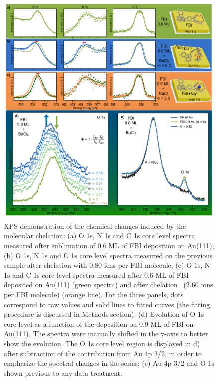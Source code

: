 \documentclass[aps,prl,reprint,longbibliography,superscriptaddress, english]{revtex4-1}
\begin{document}
\begin{figure}[ht!]
	\includegraphics[width=0.99\textwidth]{figures/Figure_2.png}
	\caption{\label{XPS_FBI_Au} 
    XPS demonstration of the chemical changes induced by the molecular chelation: (a) O 1s, N 1s and C 1s core level spectra measured after sublimation of 0.6 ML of FBI deposition on Au(111); (b) O 1s, N 1s and C 1s core level spectra measured on the previous sample after chelation with 0.80 \Bapp ions per FBI molecule; (c) O 1s, N 1s and C 1s core level spectra measured after 0.6 ML of FBI deposited on Au(111) (green spectra) and after chelation \Nap\ (2.60 \Nap ions per FBI molecule) (orange line). For the three panels, dots correspond to raw values and solid lines to fitted curves (the fitting procedure is discussed in Methods section). (d) Evolution of O 1s core level as a function of the \Bapp deposition on 0.9 ML of FBI on Au(111). The spectra were manually shifted in the y-axis to better show the evolution. The O 1s core level region is displayed in d) after subtraction of the contribution from Au 4p 3/2, in order to emphasize the spectral changes in the series; (e)  Au 4p 3/2 and O 1s shown previous to any data treatment.}
\end{figure}  
\end{document}
